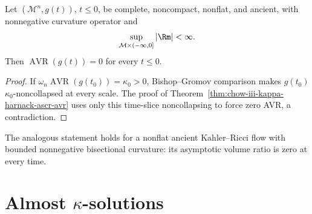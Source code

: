 \begin{corollary}[Any ancient solution with bounded $\Rm\ge0$ must have AVR $=0$]
\label{cor:chow-iii-ancient-bounded-nonnegative-avr-zero}
Let $(\mathcal M^n,g(t))$, $t\le0$, be complete, noncompact, nonflat, and
ancient, with nonnegative curvature operator and
\[
 \sup_{\mathcal M\times(-\infty,0]}|\Rm|<\infty.
\]
Then $\operatorname{AVR}(g(t))=0$ for every $t\le0$.
\end{corollary}
\begin{proof}
\sketch If $\omega_n\operatorname{AVR}(g(t_0))=\kappa_0>0$, Bishop--Gromov
comparison makes $g(t_0)$ $\kappa_0$-noncollapsed at every scale.  The proof
of Theorem~\ref{thm:chow-iii-kappa-harnack-ascr-avr} uses only this
time-slice noncollapsing to force zero AVR, a contradiction.
\end{proof}

\begin{remark}
\label{rem:chow-iii-kahler-ancient-avr-zero}
The analogous statement holds for a nonflat ancient Kahler--Ricci flow with
bounded nonnegative bisectional curvature: its asymptotic volume ratio is
zero at every time.
\end{remark}

\section{\texorpdfstring{Almost $\kappa$-solutions}{Almost Kappa-solutions}}

